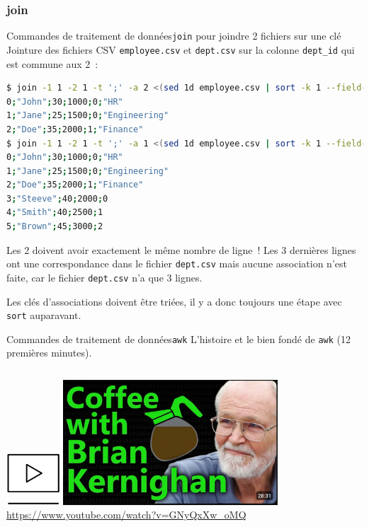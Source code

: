 \documentclass{beamer}
\begin{document}
    \subsubsection{join}\label{subsubsec:join}
    \begin{frame}[fragile]{Commandes de traitement de données}{\lstinline{join} pour joindre 2 fichiers sur une clé}
        Jointure des fichiers CSV \lstinline{employee.csv} et \lstinline{dept.csv} sur la colonne \lstinline{dept_id} qui est commune aux 2~:
        \begin{lstlisting}[language=bash,basicstyle=\tiny\ttfamily]
$ join -1 1 -2 1 -t ';' -a 2 <(sed 1d employee.csv | sort -k 1 --field-separator=';') <(sed 1d dept.csv | sort -k 1 --field-separator=';')
0;"John";30;1000;0;"HR"
1;"Jane";25;1500;0;"Engineering"
2;"Doe";35;2000;1;"Finance"
$ join -1 1 -2 1 -t ';' -a 1 <(sed 1d employee.csv | sort -k 1 --field-separator=';') <(sed 1d dept.csv | sort -k 1 --field-separator=';')
0;"John";30;1000;0;"HR"
1;"Jane";25;1500;0;"Engineering"
2;"Doe";35;2000;1;"Finance"
3;"Steeve";40;2000;0
4;"Smith";40;2500;1
5;"Brown";45;3000;2
        \end{lstlisting}
        \begin{dangercolorbox}
            Les 2 doivent avoir exactement le même nombre de ligne~!
            Les 3 dernières lignes ont une correspondance dans le fichier \lstinline{dept.csv} mais aucune association n'est faite, car le fichier \lstinline{dept.csv} n'a que 3 lignes.

            Les clés d'associations doivent être triées, il y a donc toujours une étape avec \lstinline{sort} auparavant.
        \end{dangercolorbox}
    \end{frame}

    \begin{frame}{Commandes de traitement de données}{\lstinline{awk}}
        L'histoire et le bien fondé de \lstinline{awk} (12 premières minutes).
        \bigbreak
        \begin{columns}
            \centering
            \includegraphics[width=2cm]{image/video}
            \includegraphics[width=8cm]{image/coffee-with-bk} \\ \url{https://www.youtube.com/watch?v=GNyQxXw_oMQ} \\
        \end{columns}
    \end{frame}
\end{document}

